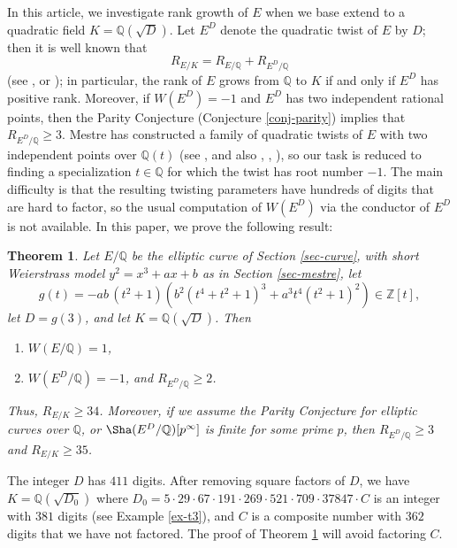 \documentclass[11pt]{amsart}
\newtheorem{thm}[defn]{Theorem}
\newcommand{\Q}{\mathbb Q}
\newcommand{\Z}{\mathbb Z}
\begin{document}
In this article, we investigate rank growth of $E$ when we base extend to a quadratic field $K=\Q(\sqrt{D})$. Let $E^D$ denote the quadratic twist of $E$ by $D$; then it is well known that
\begin{equation}\label{eq-ranksum}
R_{E/K}=R_{E/\Q}+R_{E^D/\Q}
\end{equation}
(see \cite{kida}, or \cite[Ch.~X]{silverman1}); in particular, the rank of $E$ grows from $\Q$ to $K$ if and only if $E^D$ has positive rank. Moreover, if $W(E^D)=-1$ and $E^D$ has two independent rational points, then the Parity Conjecture (Conjecture \ref{conj-parity}) implies that $R_{E^D/\Q}\geq 3$. Mestre has constructed a family of quadratic twists of $E$ with two independent points over $\Q(t)$ (see \cite{mestre}, and also \cite{rubinsilverberg}, \cite{stewarttop}, \cite{gusictadic}), so our task is reduced to finding a specialization $t\in\Q$ for which the twist has root number $-1$. The main difficulty is that the resulting twisting parameters have hundreds of digits that are hard to factor, so the usual computation of $W(E^D)$ via the conductor of $E^D$ is not available. In this paper, we prove the following result:


\begin{thm}\label{thm-main-intro}
Let $E/\Q$ be the elliptic curve of Section \ref{sec-curve}, with short Weierstrass model $y^2 = x^3+ax+b$ as in Section \ref{sec-mestre}, let
\begin{equation*}
   g(t)=-ab\,(t^2+1)\left(b^2(t^4+t^2+1)^3+a^3t^4(t^2+1)^2\right)\in\Z[t],
\end{equation*}
let $D=g(3)$, and let $K=\Q(\sqrt{D})$. Then 
\begin{enumerate}
    \item $W(E/\Q)=1$,
    \item $W(E^D/\Q)=-1$, and $R_{E^D/\Q}\geq 2$.
\end{enumerate}
Thus, $R_{E/K}\geq 34$. Moreover, if we assume the Parity Conjecture for elliptic curves over $\Q$, or $\Sha(E^D/\Q)[p^\infty]$ is finite for some prime $p$, then $R_{E^D/\Q}\geq 3$ and $R_{E/K}\geq 35$.
\end{thm}

The integer $D$ has $411$ digits. After removing square factors of $D$,  we have $K=\Q(\sqrt{D_0})$ where $D_0=5\cdot 29\cdot 67\cdot 191\cdot 269\cdot 521\cdot 709\cdot 37847\cdot C$ is an integer with $381$ digits (see Example \ref{ex-t3}), and $C$ is a composite number with $362$ digits that we have not factored. The proof of Theorem \ref{thm-main-intro} will avoid factoring $C$.
\end{document}
